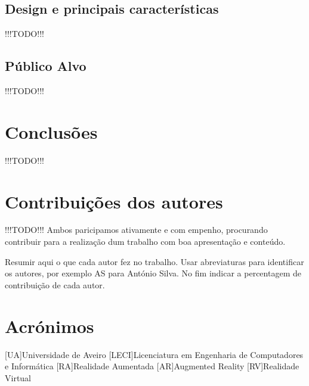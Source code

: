 \documentclass{report}
\begin{document}
\section{Design e principais características}
!!!TODO!!!

\section{Público Alvo}
!!!TODO!!!

\chapter{Conclusões}
\label{chap.conclusao}
!!!TODO!!!

\chapter*{Contribuições dos autores}
!!!TODO!!! Ambos paricipamos ativamente e com empenho, procurando contribuir para a realização dum trabalho com boa apresentação e conteúdo.

Resumir aqui o que cada autor fez no trabalho. Usar abreviaturas para identificar os autores, por exemplo AS para António Silva. No fim indicar a percentagem de contribuição de cada autor.

\chapter*{Acrónimos}
\begin{acronym}
[UA]{Universidade de Aveiro}
[LECI]{Licenciatura em Engenharia de Computadores e Informática}
[RA]{Realidade Aumentada}
[AR]{Augmented Reality}
[RV]{Realidade Virtual}
\end{acronym}

\printbibliography
\end{document}
